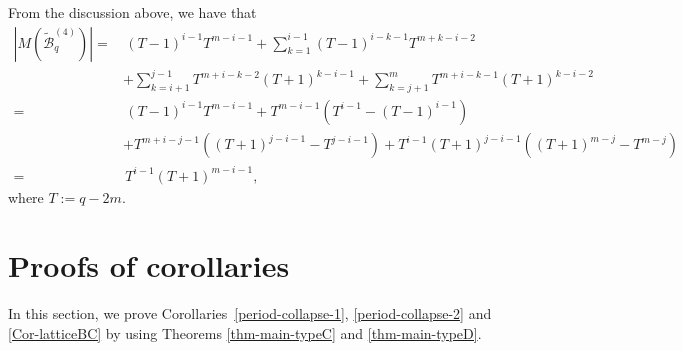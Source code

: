 \documentclass{article}
\theoremstyle{plain}
\theoremstyle{definition}
\theoremstyle{remark}
\numberwithin{equation}{section}
\newcommand{\Bc}{\mathcal{B}}
\newcommand{\Dc}{\mathcal{D}}
\begin{document}
From the discussion above, we have that
\begin{align*}
\left|M(\mathcal{\widetilde{B}}^{(4)}_q)\right|
=&\,(T-1)^{i-1}T^{m-i-1} + \sum_{k=1}^{i-1}(T-1)^{i-k-1}T^{m+k-i-2}\\
&+\sum_{k=i+1}^{j-1}T^{m+i-k-2}(T+1)^{k-i-1} + \sum_{k=j+1}^{m}T^{m+i-k-1}(T+1)^{k-i-2}\\
=&\,(T-1)^{i-1}T^{m-i-1} + T^{m-i-1}\left(T^{i-1}-(T-1)^{i-1}\right)\\
&+T^{m+i-j-1}\left((T+1)^{j-i-1}-T^{j-i-1}\right)+T^{i-1}(T+1)^{j-i-1}\left((T+1)^{m-j}-T^{m-j}\right)\\
=&\,T^{i-1}(T+1)^{m-i-1},
\end{align*}
where $T:=q-2m$.



\section{Proofs of corollaries}\label{sec:corollaries}
In this section, we prove Corollaries~\ref{period-collapse-1}, \ref{period-collapse-2} and \ref{Cor-latticeBC} by using Theorems \ref{thm-main-typeC} and \ref{thm-main-typeD}. 
\end{document}
